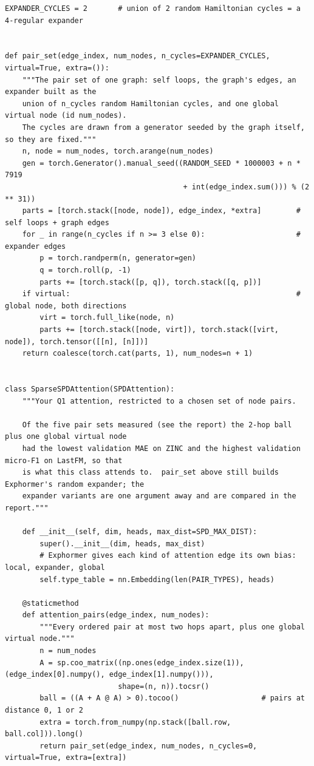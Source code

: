 \begin{lstlisting}[style=p1py]
EXPANDER_CYCLES = 2       # union of 2 random Hamiltonian cycles = a 4-regular expander


def pair_set(edge_index, num_nodes, n_cycles=EXPANDER_CYCLES, virtual=True, extra=()):
    """The pair set of one graph: self loops, the graph's edges, an expander built as the
    union of n_cycles random Hamiltonian cycles, and one global virtual node (id num_nodes).
    The cycles are drawn from a generator seeded by the graph itself, so they are fixed."""
    n, node = num_nodes, torch.arange(num_nodes)
    gen = torch.Generator().manual_seed((RANDOM_SEED * 1000003 + n * 7919
                                         + int(edge_index.sum())) % (2 ** 31))
    parts = [torch.stack([node, node]), edge_index, *extra]        # self loops + graph edges
    for _ in range(n_cycles if n >= 3 else 0):                     # expander edges
        p = torch.randperm(n, generator=gen)
        q = torch.roll(p, -1)
        parts += [torch.stack([p, q]), torch.stack([q, p])]
    if virtual:                                                    # global node, both directions
        virt = torch.full_like(node, n)
        parts += [torch.stack([node, virt]), torch.stack([virt, node]), torch.tensor([[n], [n]])]
    return coalesce(torch.cat(parts, 1), num_nodes=n + 1)


class SparseSPDAttention(SPDAttention):
    """Your Q1 attention, restricted to a chosen set of node pairs.

    Of the five pair sets measured (see the report) the 2-hop ball plus one global virtual node
    had the lowest validation MAE on ZINC and the highest validation micro-F1 on LastFM, so that
    is what this class attends to.  pair_set above still builds Exphormer's random expander; the
    expander variants are one argument away and are compared in the report."""

    def __init__(self, dim, heads, max_dist=SPD_MAX_DIST):
        super().__init__(dim, heads, max_dist)
        # Exphormer gives each kind of attention edge its own bias: local, expander, global
        self.type_table = nn.Embedding(len(PAIR_TYPES), heads)

    @staticmethod
    def attention_pairs(edge_index, num_nodes):
        """Every ordered pair at most two hops apart, plus one global virtual node."""
        n = num_nodes
        A = sp.coo_matrix((np.ones(edge_index.size(1)), (edge_index[0].numpy(), edge_index[1].numpy())),
                          shape=(n, n)).tocsr()
        ball = ((A + A @ A) > 0).tocoo()                   # pairs at distance 0, 1 or 2
        extra = torch.from_numpy(np.stack([ball.row, ball.col])).long()
        return pair_set(edge_index, num_nodes, n_cycles=0, virtual=True, extra=[extra])


\end{lstlisting}
